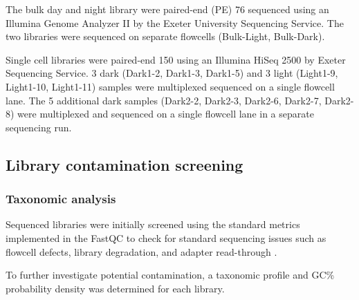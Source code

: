 The bulk day and night library were paired-end (PE) \SI{76}{\bp} sequenced using an Illumina Genome
Analyzer II by the Exeter University Sequencing Service.  The two libraries were sequenced
on separate flowcells (Bulk-Light, Bulk-Dark).

Single cell libraries were paired-end \SI{150}{\bp} using an Illumina HiSeq 2500 by Exeter
Sequencing Service. 3 dark (Dark1-2, Dark1-3, Dark1-5) and 3 light (Light1-9, Light1-10, Light1-11)
samples were multiplexed sequenced on a single flowcell lane.  The 5 additional 
dark samples (Dark2-2, Dark2-3, Dark2-6, Dark2-7, Dark2-8) were multiplexed and sequenced on a single
flowcell lane in a separate sequencing run.

\subsection{Library contamination screening}

\subsubsection{Taxonomic analysis}
Sequenced libraries were initially screened using the standard
metrics implemented in the FastQC to check for standard sequencing issues
such as flowcell defects, library degradation, and adapter read-through \citep{fastqc2015}.

To further investigate potential contamination, a taxonomic
profile and GC\% probability density was determined for each library.

